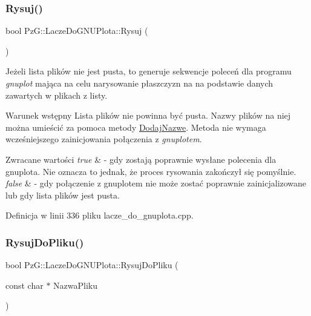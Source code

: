 \subsubsection{\texorpdfstring{Rysuj()}{Rysuj()}}
{\footnotesize\ttfamily bool Pz\+G\+::\+Lacze\+Do\+G\+N\+U\+Plota\+::\+Rysuj (\begin{DoxyParamCaption}{ }\end{DoxyParamCaption})}

Jeżeli lista plików nie jest pusta, to generuje sekwencje poleceń dla programu {\itshape gnuplot} mająca na celu narysowanie płaszczyzn na na podstawie danych zawartych w plikach z listy.

\begin{DoxyPrecond}{Warunek wstępny}
Lista plików nie powinna być pusta. Nazwy plików na niej można umieścić za pomoca metody \hyperlink{}{Dodaj\+Nazwe}. Metoda nie wymaga wcześniejszego zainicjowania połączenia z {\itshape gnuplotem}. 
\end{DoxyPrecond}

\begin{DoxyRetVals}{Zwracane wartości}
{\em true} & -\/ gdy zostają poprawnie wysłane polecenia dla gnuplota. Nie oznacza to jednak, że proces rysowania zakończył się pomyślnie. \\
\hline
{\em false} & -\/ gdy połączenie z gnuplotem nie może zostać poprawnie zainicjalizowane lub gdy lista plików jest pusta. \\
\hline
\end{DoxyRetVals}


Definicja w linii 336 pliku lacze\+\_\+do\+\_\+gnuplota.\+cpp.

\mbox{\label{class_pz_g_1_1_lacze_do_g_n_u_plota_addae9ac156ae2fb227f792faff3aa148}} 
\subsubsection{\texorpdfstring{Rysuj\+Do\+Pliku()}{RysujDoPliku()}}
{\footnotesize\ttfamily bool Pz\+G\+::\+Lacze\+Do\+G\+N\+U\+Plota\+::\+Rysuj\+Do\+Pliku (\begin{DoxyParamCaption}\item[{const char $\ast$}]{Nazwa\+Pliku }\end{DoxyParamCaption})}

